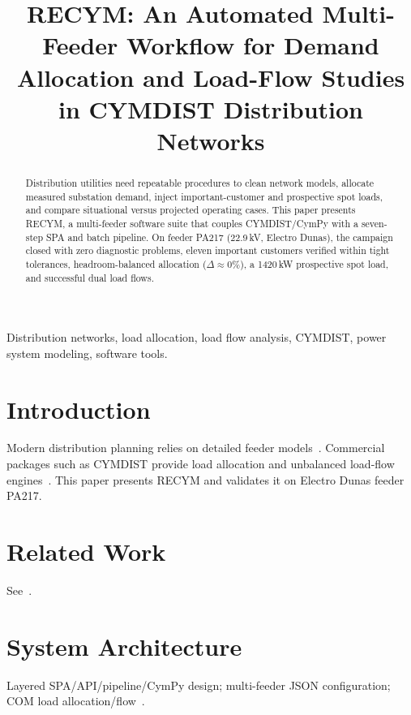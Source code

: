 \documentclass[journal]{IEEEtran}
\begin{document}
\title{RECYM: An Automated Multi-Feeder Workflow for Demand Allocation and Load-Flow Studies in CYMDIST Distribution Networks}

\author{
}

\maketitle

\begin{abstract}
Distribution utilities need repeatable procedures to clean network models, allocate measured substation demand, inject important-customer and prospective spot loads, and compare situational versus projected operating cases. This paper presents RECYM, a multi-feeder software suite that couples CYMDIST/CymPy with a seven-step SPA and batch pipeline. On feeder PA217 (22.9\,kV, Electro Dunas), the campaign closed with zero diagnostic problems, eleven important customers verified within tight tolerances, headroom-balanced allocation ($\Delta\approx0\%$), a 1420\,kW prospective spot load, and successful dual load flows.
\end{abstract}

\begin{IEEEkeywords}
Distribution networks, load allocation, load flow analysis, CYMDIST, power system modeling, software tools.
\end{IEEEkeywords}

\section{Introduction}
Modern distribution planning relies on detailed feeder models~\cite{Kersting2017,Gonen2014}.
Commercial packages such as CYMDIST provide load allocation and unbalanced load-flow engines~\cite{CYME92}.
This paper presents RECYM and validates it on Electro Dunas feeder PA217.

\section{Related Work}
See~\cite{Dugan2011OpenDSS,Thurner2018Pandapower,Peppanen2015AMI,Rylander2015Hosting,IEEE1547_2018}.

\section{System Architecture}
Layered SPA/API/pipeline/CymPy design; multi-feeder JSON configuration; COM load allocation/flow~\cite{CYME92}.
\end{document}

